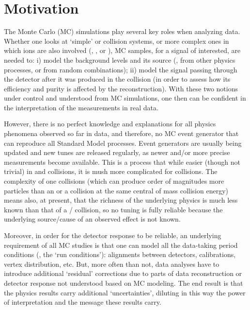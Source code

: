 \section{Motivation}
The Monte Carlo (MC) simulations play several key roles when analyzing data. Whether one looks at `simple'  \eecol or {\pp} collision systems, or more complex ones in which ions are also involved (\eA, \pA, or \aacol ), MC samples, for a signal of interested, are needed to: i) model the background levels and its source (\ie, from other physics processes, or from random combinations); ii) model the signal passing through the detector after it was produced in the collision (in order to assess how its efficiency and purity is affected by the reconstruction). With these two notions under control and understood from MC simulations, one then can be confident in the interpretation of the measurements in real data. 

However, there is no perfect knowledge and explanations for all physics phenomena observed so far in data, and therefore, no MC event generator that can reproduce all Standard Model processes. Event generators are usually being updated and new tunes are released regularly, as newer and/or more precise measurements become available. This is a process that while easier (though not trivial) in {\eecol} and {\pp} collisions, it is mush more complicated for {\aacol} collisions. The complexity of one {\aacol} collisions (which can produce order of magnitudes more particles than an \eecol or a {\pp} collision at the same central of mass collision energy) means also, at present, that the richness of the underlying physics is much less known than that of a \eecol/{\pp} collision, so no tuning is fully reliable because the underlying source/cause of an observed effect is not known. 

Moreover, in order for the detector response to be reliable, an underlying requirement of all MC studies is that one can model all the data-taking period conditions (\ie, the `run conditions'): alignments between detectors, calibrations, vertex distribution, etc. But, more often than not, data analyses have to introduce additional `residual' corrections due to parts of data reconstruction or detector response not understood based on MC modeling. The end result is that the physics results carry additional `uncertainties', diluting in this way the power of interpretation and the message these results carry. 

